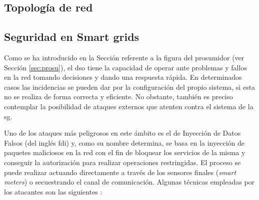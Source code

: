 


\vspace{1mm}

\subsection{Topología de red}




\vspace{1mm}

\subsection{Seguridad en Smart grids}
\label{sec:seg}
 
Como se ha introducido en la Sección referente a la figura del prosumidor (ver Sección \ref{sec:prosu}), el \gls{dso} tiene la capacidad de operar ante problemas y fallos en la red tomando decisiones y dando una respuesta rápida. En determinados casos las incidencias se pueden dar por la configuración del propio sistema, si esta no se realiza de forma correcta y eficiente. No obstante, también es preciso contemplar la posibilidad de ataques externos que atenten contra el sistema de la \gls{sg}.

\vspace{3mm}

Uno de los ataques más peligrosos en este ámbito es el de Inyección de Datos Falsos (del inglés \gls{fdi}) \cite{baddata} y, como su nombre determina, se basa en la inyección de paquetes maliciosos en la red con el fin de bloquear los servicios de la misma y conseguir la autorización para realizar operaciones restringidas. El proceso se puede realizar actuando directamente a través de los sensores finales (\textit{smart meters}) o secuestrando el canal de comunicación. Algunas técnicas empleadas por los atacantes son las siguientes \cite{baddata}:

